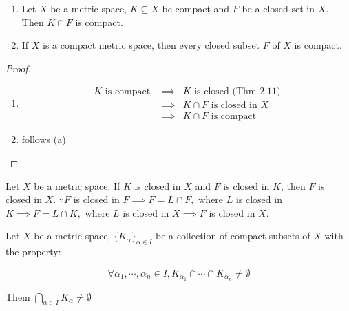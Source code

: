 \newpage

\begin{cor}$ $
	\begin{enumerate}[wide,label=(\alph*)]
		\item Let $X$  be a metric space, $K \subseteq X$ be compact and $F$ be a closed set in $X$. Then $K \cap F$ is compact.
		\item If $X$ is a compact metric space, then every closed subset $F$ of $X$ is compact.
	\end{enumerate}
\end{cor}

\begin{proof}$ $
	\begin{enumerate}[wide,label=(\alph*)]
		\item 
		\begin{eqnarray*}
			K\text{ is compact } &\implies& K\text{ is closed (Thm 2.11)}\\
			&\implies&K \cap F \text{ is closed in }X \\ 
			&\implies&K \cap F \text{ is compact}
		\end{eqnarray*}
		\item follows (a)
	\end{enumerate}
\end{proof}

\begin{rmk*}
	Let $X$ be a metric space. If $K$ is closed in $X$ and $F$ is closed in $K$, then $F$ is closed in $X$. $\because F$ is closed in $F \implies F = L \cap F,$ where $L$ is closed in $K \implies F = L \cap K,$ where $L$ is closed in $X \implies F$ is closed in $X$. 
\end{rmk*}

\begin{thm}
	Let $X$ be a metric space, $\{K_{\alpha}\}_{\alpha \in I}$ be a collection of compact subsets of $X$ with the property:
	
	$$\forall \alpha_1,\cdots,\alpha_n \in I, K_{\alpha_1} \cap \cdots \cap K_{\alpha_n} \neq \emptyset$$
	
	Them $\bigcap_{\alpha \in I}K_{\alpha} \neq \emptyset$
\end{thm}

